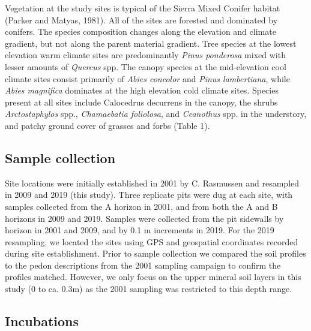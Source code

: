 \documentclass[soil, manuscript]{copernicus}
\begin{document}
Vegetation at the study sites is typical of the Sierra Mixed Conifer
habitat (Parker and Matyas, 1981). All of the sites are forested and
dominated by conifers. The species composition changes along the
elevation and climate gradient, but not along the parent material
gradient. Tree species at the lowest elevation warm climate sites are
predominantly \emph{Pinus ponderosa} mixed with lesser amounts of
\emph{Quercus} spp. The canopy species at the mid-elevation cool climate
sites consist primarily of \emph{Abies concolor} and \emph{Pinus
lambertiana}, while \emph{Abies magnifica} dominates at the high
elevation cold climate sites. Species present at all sites include
Calocedrus decurrens in the canopy, the shrubs \emph{Arctostaphylos}
spp., \emph{Chamaebatia foliolosa}, and \emph{Ceanothus} spp. in the
understory, and patchy ground cover of grasses and forbs (Table 1).

\subsection{Sample collection}

Site locations were initially established in 2001 by C. Rasmussen
\citep{rasmussen2004} and resampled in 2009 \citep{rasmussen2018b} and
2019 (this study). Three replicate pits were dug at each site, with
samples collected from the A horizon in 2001, and from both the A and B
horizons in 2009 and 2019. Samples were collected from the pit sidewalls
by horizon in 2001 and 2009, and by 0.1 m increments in 2019. For the
2019 resampling, we located the sites using GPS and geospatial
coordinates recorded during site establishment. Prior to sample
collection we compared the soil profiles to the pedon descriptions from
the 2001 sampling campaign to confirm the profiles matched. However, we
only focus on the upper mineral soil layers in this study (0 to ca.
0.3m) as the 2001 sampling was restricted to this depth range.

\subsection{Incubations}
\end{document}
